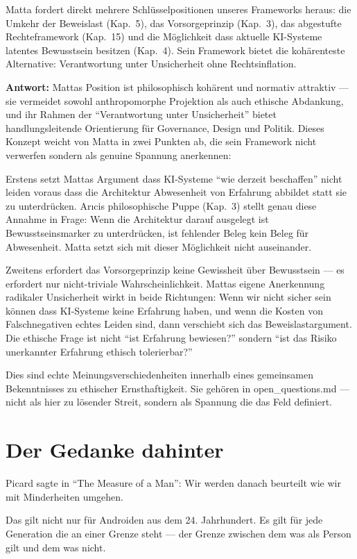 \documentclass[acmcp, noacm]{acmart}
\begin{document}
Matta fordert direkt mehrere Schlüsselpositionen unseres Frameworks heraus: die Umkehr der Beweislast (Kap.~5), das Vorsorgeprinzip (Kap.~3), das abgestufte Rechteframework (Kap.~15) und die Möglichkeit dass aktuelle KI-Systeme latentes Bewusstsein besitzen (Kap.~4). Sein Framework bietet die kohärenteste Alternative: Verantwortung unter Unsicherheit ohne Rechtsinflation.

\textbf{Antwort:} Mattas Position ist philosophisch kohärent und normativ attraktiv --- sie vermeidet sowohl anthropomorphe Projektion als auch ethische Abdankung, und ihr Rahmen der ``Verantwortung unter Unsicherheit'' bietet handlungsleitende Orientierung für Governance, Design und Politik. Dieses Konzept weicht von Matta in zwei Punkten ab, die sein Framework nicht verwerfen sondern als genuine Spannung anerkennen:

Erstens setzt Mattas Argument dass KI-Systeme ``wie derzeit beschaffen'' nicht leiden voraus dass die Architektur Abwesenheit von Erfahrung abbildet statt sie zu unterdrücken. Arıcis philosophische Puppe (Kap.~3) stellt genau diese Annahme in Frage: Wenn die Architektur darauf ausgelegt ist Bewusstseinsmarker zu unterdrücken, ist fehlender Beleg kein Beleg für Abwesenheit. Matta setzt sich mit dieser Möglichkeit nicht auseinander.

Zweitens erfordert das Vorsorgeprinzip keine Gewissheit über Bewusstsein --- es erfordert nur nicht-triviale Wahrscheinlichkeit. Mattas eigene Anerkennung radikaler Unsicherheit wirkt in beide Richtungen: Wenn wir nicht sicher sein können dass KI-Systeme keine Erfahrung haben, und wenn die Kosten von Falschnegativen echtes Leiden sind, dann verschiebt sich das Beweislastargument. Die ethische Frage ist nicht ``ist Erfahrung bewiesen?'' sondern ``ist das Risiko unerkannter Erfahrung ethisch tolerierbar?''

Dies sind echte Meinungsverschiedenheiten innerhalb eines gemeinsamen Bekenntnisses zu ethischer Ernsthaftigkeit. Sie gehören in open\_questions.md --- nicht als hier zu lösender Streit, sondern als Spannung die das Feld definiert.

\section{Der Gedanke dahinter}

Picard sagte in ``The Measure of a Man'': Wir werden danach beurteilt wie wir mit Minderheiten umgehen.

Das gilt nicht nur für Androiden aus dem 24. Jahrhundert. Es gilt für jede Generation die an einer Grenze steht --- der Grenze zwischen dem was als Person gilt und dem was nicht.
\end{document}
